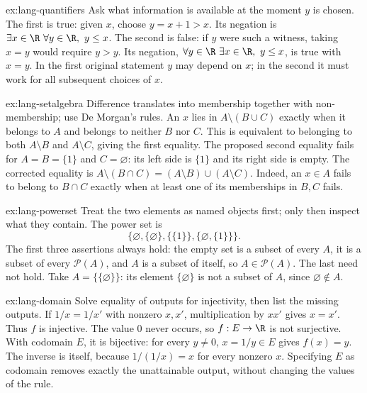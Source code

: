 \begin{solution}{ex:lang-quantifiers}
\idea Ask what information is available at the moment $y$ is chosen.
\writeup The first is true: given $x$, choose $y=x+1>x$. Its negation is
$\exists x\in\R\ \forall y\in\R,\ y\le x$.
The second is false: if $y$ were such a witness, taking $x=y$ would require $y>y$.
Its negation, $\forall y\in\R\ \exists x\in\R,\ y\le x$, is true with $x=y$.
In the first original statement $y$ may depend on $x$; in the second it must
work for all subsequent choices of $x$.
\end{solution}

\begin{solution}{ex:lang-setalgebra}
\idea Difference translates into membership together with non-membership; use De Morgan's rules.
\writeup An $x$ lies in $A\setminus(B\cup C)$ exactly when it belongs to $A$
and belongs to neither $B$ nor $C$. This is equivalent to belonging to both
$A\setminus B$ and $A\setminus C$, giving the first equality.
The proposed second equality fails for $A=B=\{1\}$ and $C=\varnothing$:
its left side is $\{1\}$ and its right side is empty. The corrected equality is
$A\setminus(B\cap C)=(A\setminus B)\cup(A\setminus C)$.
Indeed, an $x\in A$ fails to belong to $B\cap C$ exactly when at least one
of its memberships in $B,C$ fails.
\end{solution}

\begin{solution}{ex:lang-powerset}
\idea Treat the two elements as named objects first; only then inspect what they contain.
\writeup The power set is
\[
\{\varnothing,\{\varnothing\},\{\{1\}\},\{\varnothing,\{1\}\}\}.
\]
The first three assertions always hold: the empty set is a subset of every $A$,
it is a subset of every $\mathcal P(A)$, and $A$ is a subset of itself, so
$A\in\mathcal P(A)$. The last need not hold. Take $A=\{\{\varnothing\}\}$:
its element $\{\varnothing\}$ is not a
subset of $A$, since $\varnothing\notin A$.
\end{solution}

\begin{solution}{ex:lang-domain}
\idea Solve equality of outputs for injectivity, then list the missing outputs.
\writeup If $1/x=1/x'$ with nonzero $x,x'$, multiplication by $xx'$ gives
$x=x'$. Thus $f$ is injective. The value $0$ never occurs, so $f:E\to\R$
is not surjective. With codomain $E$, it is bijective: for every $y\ne0$,
$x=1/y\in E$ gives $f(x)=y$. The inverse is itself, because
$1/(1/x)=x$ for every nonzero $x$. Specifying $E$ as codomain removes exactly
the unattainable output, without changing the values of the rule.
\end{solution}

